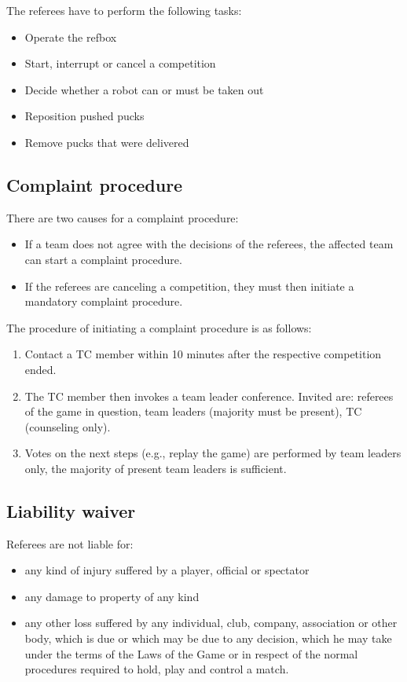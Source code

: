 \documentclass[12pt,twoside]{article}
\begin{document}
The referees have to perform the following tasks:
\begin{itemize}
\item Operate the refbox
\item Start, interrupt or cancel a competition
\item Decide whether a robot can or must be taken out
\item Reposition pushed pucks
\item Remove pucks that were delivered
\end{itemize}

\subsection{Complaint procedure}
There are two causes for a complaint procedure:
\begin{itemize}
\item If a team does not agree with the decisions of the referees, the affected team can start a complaint procedure.
\item If the referees are canceling a competition, they must then initiate a mandatory complaint procedure.
\end{itemize}

The procedure of initiating a complaint procedure is as follows:
\begin{enumerate}
\item Contact a TC member within 10 minutes after the respective competition ended.
\item The TC member then invokes a team leader conference. Invited are: referees of the game in question, team leaders (majority must be present), TC (counseling only).
\item Votes on the next steps (e.g., replay the game) are performed by team leaders only, the majority of present team leaders is sufficient.
\end{enumerate}

\subsection{Liability waiver}
Referees are not liable for:
\begin{itemize}
\item any kind of injury suffered by a player, official or spectator
\item any damage to property of any kind
\item any other loss suffered by any individual, club, company, association or other body, which is due or which may be due to any decision, which he may take under the terms of the Laws of the Game or in respect of the normal procedures required to hold, play and control a match.
\end{itemize}
\end{document}
